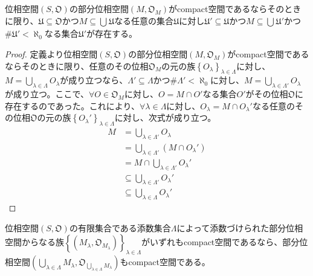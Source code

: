 \documentclass[dvipdfmx]{jsarticle}
\begin{document}
\begin{thm}\label{8.1.6.2}
位相空間$\left( S,\mathfrak{O} \right)$の部分位相空間$\left( M,\mathfrak{O}_{M} \right)$がcompact空間であるならそのときに限り、$\mathfrak{U \subseteq O}$かつ$M \subseteq \bigcup_{} \mathfrak{U}$なる任意の集合$\mathfrak{U}$に対し$\mathfrak{U}'\subseteq \mathfrak{U}$かつ$M \subseteq \bigcup_{} \mathfrak{U}'$かつ${\#}\mathfrak{U}' < \aleph_{0}$なる集合$\mathfrak{U}'$が存在する。
\end{thm}
\begin{proof}
定義より位相空間$\left( S,\mathfrak{O} \right)$の部分位相空間$\left( M,\mathfrak{O}_{M} \right)$がcompact空間であるならそのときに限り、任意のその位相$\mathfrak{O}_{M}$の元の族$\left\{ O_{\lambda} \right\}_{\lambda \in \varLambda}$に対し、$M = \bigcup_{\lambda \in \varLambda} O_{\lambda}$が成り立つなら、$\varLambda' \subseteq \varLambda$かつ${\#}\varLambda' < \aleph_{0}$に対し、$M = \bigcup_{\lambda \in \varLambda'} O_{\lambda}$が成り立つ。ここで、$\forall O \in \mathfrak{O}_{M}$に対し、$O = M \cap O'$なる集合$O'$がその位相$\mathfrak{O}$に存在するのであった。これにより、$\forall\lambda \in \varLambda$に対し、$O_{\lambda} = M \cap O_{\lambda}'$なる任意のその位相$\mathfrak{O}$の元の族$\left\{ O_{\lambda}' \right\}_{\lambda \in \varLambda}$に対し、次式が成り立つ。
\begin{align*}
M &= \bigcup_{\lambda \in \varLambda'} O_{\lambda}\\
&= \bigcup_{\lambda \in \varLambda'} \left( M \cap O_{\lambda}' \right)\\
&= M \cap \bigcup_{\lambda \in \varLambda'} O_{\lambda}'\\
&\subseteq \bigcup_{\lambda \in \varLambda'} O_{\lambda}'\\
&\subseteq \bigcup_{\lambda \in \varLambda} O_{\lambda}'
\end{align*}
\end{proof}
\begin{thm}\label{8.1.6.3}
位相空間$\left( S,\mathfrak{O} \right)$の有限集合である添数集合$\varLambda$によって添数づけられた部分位相空間からなる族$\left\{ \left( M_{\lambda},\mathfrak{O}_{M_{\lambda}} \right) \right\}_{\lambda \in \varLambda }$がいずれもcompact空間であるなら、部分位相空間$\left( \bigcup_{\lambda \in \varLambda } M_{\lambda},\mathfrak{O}_{\bigcup_{\lambda \in \varLambda } M_{\lambda}} \right)$もcompact空間である。
\end{thm}
\end{document}
